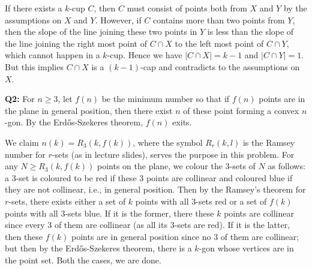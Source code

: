 \documentclass[12pt,reqno]{amsart}
\theoremstyle{definition}
\begin{document}
If there exists a $k$-cup $C$, then $C$ must consist of points both from $X$ and $Y$ by the assumptions on $X$ and $Y$. However, if $C$ contains more than two points from $Y$, then the slope of the line joining these two points in $Y$ is less than the slope of the line joining the right most point of $C\cap X$ to the left most point of $C\cap Y$, which cannot happen in a $k$-cup. Hence we have $|C\cap X|=k-1$ and $|C\cap Y|=1$. But this implies $C\cap X$ is a $(k-1)$-cap and contradicts to the assumptions on $X$.


\newpage

\noindent \textbf{Q2:} For $n \geq 3$, let $f(n)$ be the minimum number so that if $f(n)$ points are in the plane in general position, then there exist $n$ of these point forming a convex $n$-gon. By the Erd\H{o}s-Szekeres theorem, $f(n)$ exits.


We claim $n(k)=R_3(k,f(k))$, where the symbol $R_r(k,l)$ is the Ramsey number for $r$-sets (as in lecture slides), serves the purpose in this problem. For any $N\geq R_3(k,f(k))$ points on the plane, we colour the 3-sets of $N$ as follows: a 3-set is coloured to be red if these 3 points are collinear and coloured blue if they are not collinear, i.e., in general position. Then by the Ramsey's theorem for $r$-sets, there exists either a set of $k$ points with all 3-sets red or a set of $f(k)$ points with all 3-sets blue. If it is the former, there these $k$ points are collinear since every 3 of them are collinear (as all its 3-sets are red). If it is the latter, then these $f(k)$ points are in general position since no 3 of them are collinear; but then by the Erd\H{o}s-Szekeres theorem, there is a $k$-gon whose vertices are in the point set. Both the cases, we are done.

\end{document}

